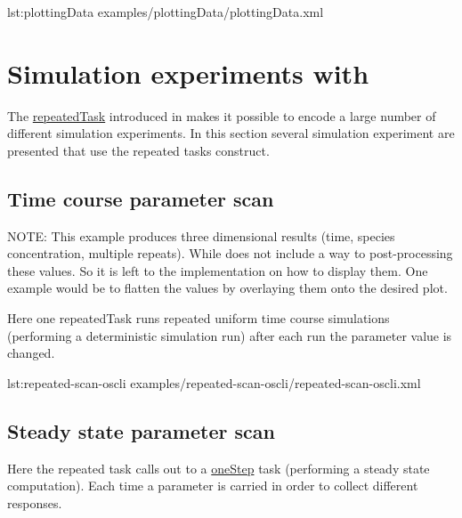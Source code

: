 
{lst:plottingData}
{examples/plottingData/plottingData.xml}


\section{Simulation experiments with }
The \hyperref[class:repeatedTask]{repeatedTask} introduced in \LoneVtwo makes it possible to encode a large number of different simulation experiments. In this section several simulation experiment are presented that use the repeated tasks construct. 

\subsection{Time course parameter scan}
NOTE: This example produces three dimensional results (time, species concentration, multiple repeats). While \LoneVtwo does not include a way to post-processing these values. So it is left to the implementation on how to display them. One example would be to flatten the values by overlaying them onto the desired plot. 

Here one repeatedTask  runs repeated uniform time course simulations (performing a deterministic simulation run) after each run the parameter value is changed.


{lst:repeated-scan-oscli}
{examples/repeated-scan-oscli/repeated-scan-oscli.xml}


\subsection{Steady state parameter scan}
Here the repeated task calls out to a \hyperref[class:oneStep]{oneStep} task (performing a steady state computation). Each time a parameter is carried in order to collect different responses. 

